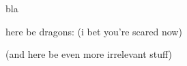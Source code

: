 \documentclass{beamer}
\begin{document}
\begin{frame}
  bla
\end{frame}

\begin{frame}

here be dragons: \dragons (i bet you're scared now)

(and here be even more irrelevant stuff)

\end{frame}
\end{document}
